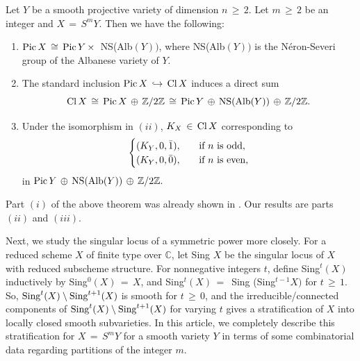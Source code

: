 \documentclass[12pt,reqno]{amsart}
\newenvironment{manualtheorem}[1]{%
\renewcommand\themanualtheoreminner{#1}%
  \manualtheoreminner
}{\endmanualtheoreminner}
\theoremstyle{definition}
\numberwithin{equation}{section}
\begin{document}
\begin{manualtheorem}{1}\label{A}

Let $Y$ be a smooth projective variety of dimension $n\, \geq\, 2$. Let $m\,\geq\, 2$ be an integer and $ X\,=\, S^{m}Y$. Then we have the following:
\begin{enumerate}
\item[$(i)$] $\textnormal{Pic}\,X \,\cong\, \textnormal{Pic}\,Y \,\times\,$ \textnormal{NS(Alb}$(Y))$, where \textnormal{NS(Alb}$(Y))$ is the N{\'e}ron-Severi group of the Albanese variety of $Y$. 
\item[$(ii)$] The standard inclusion $ \textnormal{Pic}\, X\, \hookrightarrow\, \textnormal{Cl}\,X$ induces a direct sum $$\textnormal{Cl}\, X \,\cong\, \textnormal{Pic}\,X\, \oplus\, \mathbb{Z}/{2}\mathbb{Z}\, \cong\, \textnormal{Pic}\,Y\, \oplus\, \textnormal{NS(Alb($Y$))} \,\oplus\,\mathbb{Z}/{2}\mathbb{Z}.$$
\item[$(iii)$] Under the isomorphism in $(ii)$, $ K_{X}\, \in\, \textnormal{Cl}\,X$  corresponding to 
\begin{equation*}
 \begin{cases}
(K_{Y}, 0, \Bar{1}), & \quad \textnormal{if $n$ is odd},\\
(K_{Y}, 0, \Bar{0}), & \quad\textnormal{if $n$ is even}, 
\end{cases}
\end{equation*}
in $\textnormal{Pic}\,Y\, \oplus\, \textnormal{NS(Alb}(Y)) \,\oplus\, \mathbb{Z}/{2\mathbb{Z}}.$
         
\end{enumerate}
 \end{manualtheorem}

Part $(i)$ of the above theorem was already shown in \cite{Fo}. Our results are parts $(ii)$ and $(iii).$

 Next, we study the singular locus of a symmetric power more closely. For a reduced scheme $X$ of finite type over $\mathbb{C}$, let Sing $X$ be the singular locus of $X$ with reduced subscheme structure. For nonnegative integers $t$, define Sing$^t(X)$ inductively by Sing$^0(X)\,=\,X$, and Sing$^t(X)\, = \,$ Sing (Sing$^{t-1} X)$ for $t\,\geq\, 1$. So, $ \textnormal{Sing}^{t}(X)\setminus \textnormal{Sing}^{t+1}(X)$ is smooth for $t\,\geq\, 0$, and the irreducible/connected components of $ \textnormal{Sing}^{t}(X)\setminus \textnormal{Sing}^{t+1}(X)$ for varying $t$ gives a stratification of $X$ into locally closed smooth subvarieties. In this article, we completely describe this stratification for $X\,=\,S^mY$ for a smooth variety $Y$ in terms of some combinatorial data regarding partitions of the integer $m.$
 
\end{document}
